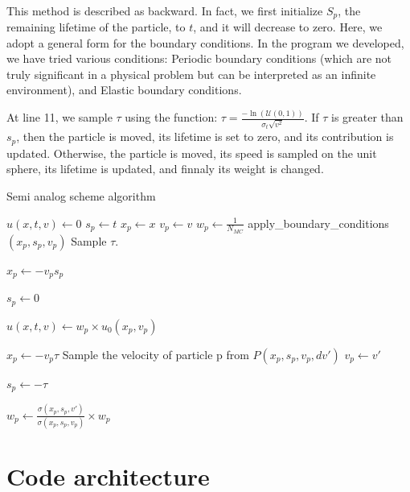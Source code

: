 \documentclass[a4paper, 11pt]{article}
\begin{document}
\paragraph{}
This method is described as backward. In fact, we first initialize $S_p$, the remaining lifetime of the particle, to $t$, and it will decrease to zero. Here, we adopt a general form for the boundary conditions. In the program we developed, we have tried various conditions: Periodic boundary conditions (which are not truly significant in a physical problem but can be interpreted as an infinite environment), and Elastic boundary conditions.

At line 11, we sample $\tau$ using the function: $\tau = \frac{-\ln(\mathcal{U}(0,1))}{\sigma_t \sqrt{v^2}}$. If $\tau$ is greater than $s_p$, then the particle is moved, its lifetime is set to zero, and its contribution is updated. Otherwise, the particle is moved, its speed is sampled on the unit sphere, its lifetime is updated, and finnaly its weight is changed.






\begin{algorithm}
	\caption{Semi analog scheme algorithm}
	\begin{algorithmic}[1]
		\State $u(x, t, v) \gets 0$
		\State $s_p \gets t$ 
		\State $x_p \gets x$
		\State $v_p \gets v$
		\State $w_p \gets \frac{1}{N_{MC}}$
		\State apply\_boundary\_conditions$(x_p, s_p, v_p)$
		\EndIf
		\State Sample $\tau$.



		\State $x_p \gets - v_p s_p$

		\State $s_p \gets 0$

		\State $u(x, t, v) \gets w_p \times u_0(x_p, v_p)$
		\Else

		\State $x_p \gets - v_p \tau$
		\State Sample the velocity of particle p from $P(x_p, s_p, v_p, dv')$
		\State $v_p \gets v'$

		\State $s_p \gets - \tau$

		\State $w_p \gets \frac{\sigma(x_p, s_p, v')}{\sigma(x_p, s_p, v_p)} \times w_p$
		\EndIf
		\EndWhile
		\EndFor
	\end{algorithmic}
\end{algorithm}






\section{Code architecture}
\end{document}
